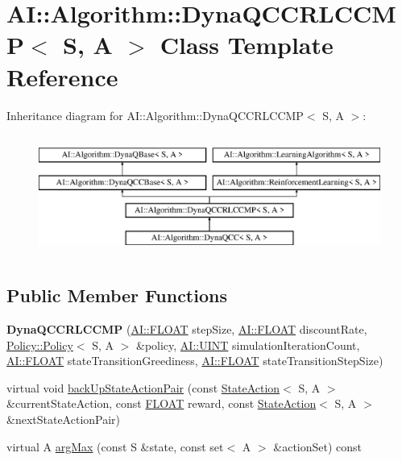 \hypertarget{classAI_1_1Algorithm_1_1DynaQCCRLCCMP}{\section{A\-I\-:\-:Algorithm\-:\-:Dyna\-Q\-C\-C\-R\-L\-C\-C\-M\-P$<$ S, A $>$ Class Template Reference}
\label{classAI_1_1Algorithm_1_1DynaQCCRLCCMP}
}
Inheritance diagram for A\-I\-:\-:Algorithm\-:\-:Dyna\-Q\-C\-C\-R\-L\-C\-C\-M\-P$<$ S, A $>$\-:\begin{figure}[H]
\begin{center}
\leavevmode
\includegraphics[height=4.000000cm]{classAI_1_1Algorithm_1_1DynaQCCRLCCMP}
\end{center}
\end{figure}
\subsection*{Public Member Functions}
\begin{DoxyCompactItemize}
\item 
\hypertarget{classAI_1_1Algorithm_1_1DynaQCCRLCCMP_a892dd156f280dd375d7f248258531043}{{\bfseries Dyna\-Q\-C\-C\-R\-L\-C\-C\-M\-P} (\hyperlink{namespaceAI_a41b74884a20833db653dded3918e05c3}{A\-I\-::\-F\-L\-O\-A\-T} step\-Size, \hyperlink{namespaceAI_a41b74884a20833db653dded3918e05c3}{A\-I\-::\-F\-L\-O\-A\-T} discount\-Rate, \hyperlink{classAI_1_1Algorithm_1_1Policy_1_1Policy}{Policy\-::\-Policy}$<$ S, A $>$ \&policy, \hyperlink{namespaceAI_ab6e14dc1e659854858a87e511f1439ec}{A\-I\-::\-U\-I\-N\-T} simulation\-Iteration\-Count, \hyperlink{namespaceAI_a41b74884a20833db653dded3918e05c3}{A\-I\-::\-F\-L\-O\-A\-T} state\-Transition\-Greediness, \hyperlink{namespaceAI_a41b74884a20833db653dded3918e05c3}{A\-I\-::\-F\-L\-O\-A\-T} state\-Transition\-Step\-Size)}\label{classAI_1_1Algorithm_1_1DynaQCCRLCCMP_a892dd156f280dd375d7f248258531043}

\item 
virtual void \hyperlink{classAI_1_1Algorithm_1_1DynaQCCRLCCMP_aebff9b81db5bd2ae33bd3d6662539bc0}{back\-Up\-State\-Action\-Pair} (const \hyperlink{classAI_1_1StateAction}{State\-Action}$<$ S, A $>$ \&current\-State\-Action, const \hyperlink{namespaceAI_a41b74884a20833db653dded3918e05c3}{F\-L\-O\-A\-T} reward, const \hyperlink{classAI_1_1StateAction}{State\-Action}$<$ S, A $>$ \&next\-State\-Action\-Pair)
\item 
virtual A \hyperlink{classAI_1_1Algorithm_1_1DynaQCCRLCCMP_a145fa4fdba2289842a77c9d483a42ef2}{arg\-Max} (const S \&state, const set$<$ A $>$ \&action\-Set) const 
\end{DoxyCompactItemize}

